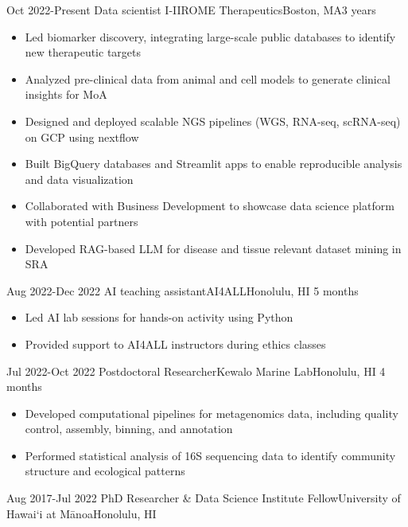 %
%
%
\begin{experiences}

\experience
{Oct 2022-Present}  {Data scientist I-II}{ROME Therapeutics}{Boston, MA}{3 years}{
\begin{itemize}
    \item Led biomarker discovery, integrating large-scale public databases to identify new therapeutic targets
    \item Analyzed pre-clinical data from animal and cell models to generate clinical insights for MoA
    \item Designed and deployed scalable NGS pipelines (WGS, RNA-seq, scRNA-seq) on GCP using nextflow
    \item Built BigQuery databases and Streamlit apps to enable reproducible analysis and data visualization
    \item Collaborated with Business Development to showcase data science platform with potential partners
    \item Developed RAG-based LLM for disease and tissue relevant dataset mining in SRA
    \end{itemize}
}{}
\experience
{Aug 2022-Dec 2022} {AI teaching assistant}{AI4ALL}{Honolulu, HI}
{5 months}{
\begin{itemize}
    \item Led AI lab sessions for hands-on activity using Python
    \item Provided support to AI4ALL instructors during ethics classes
\end{itemize}
}{}
\experience
{Jul 2022-Oct 2022} {Postdoctoral Researcher}{Kewalo Marine Lab}{Honolulu, HI}
{4 months}{
\begin{itemize}
    \item Developed computational pipelines for metagenomics data, including quality control, assembly, binning, and annotation
    \item Performed statistical analysis of 16S sequencing data to identify community structure and ecological patterns
    \end{itemize}
}{}
\experience
{Aug 2017-Jul 2022}   {PhD Researcher \& Data Science Institute Fellow}{University of Hawai`i at Mānoa}{Honolulu, HI}

\end{experiences}
